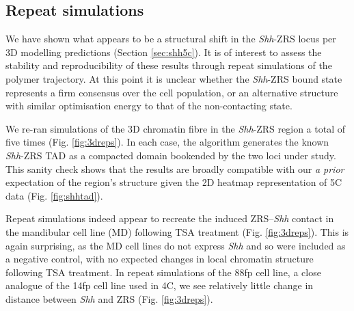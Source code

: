 \documentclass[a4paper,11pt,oneside]{book}
\begin{document}
\subsection{Repeat simulations}

We have shown what appears to be a structural shift in the \emph{Shh}-ZRS locus per 3D modelling predictions (Section \ref{sec:shh5c}). It is of interest to assess the stability and reproducibility of these results through repeat simulations of the polymer trajectory. At this point it is unclear whether the \emph{Shh}-ZRS bound state represents a firm consensus over the cell population, or an alternative structure with similar optimisation energy to that of the non-contacting state. 


We re-ran simulations of the 3D chromatin fibre in the \emph{Shh}-ZRS region a total of five times (Fig. \ref{fig:3dreps}). In each case, the algorithm generates the known \emph{Shh}-ZRS TAD as a compacted domain bookended by the two loci under study. This sanity check shows that the results are broadly compatible with our \emph{a prior} expectation of the region's structure given the 2D heatmap representation of 5C data (Fig. \ref{fig:shhtad}).

Repeat simulations indeed appear to recreate the induced ZRS--\emph{Shh} contact in the mandibular cell line (MD) following TSA treatment (Fig. \ref{fig:3dreps}). This is again surprising, as the MD cell lines do not express \emph{Shh} and so were included as a negative control, with no expected changes in local chromatin structure following TSA treatment. In repeat simulations of the 88fp cell line, a close analogue of the 14fp cell line used in 4C, we see relatively little change in distance between \emph{Shh} and ZRS (Fig. \ref{fig:3dreps}). 
\end{document}
